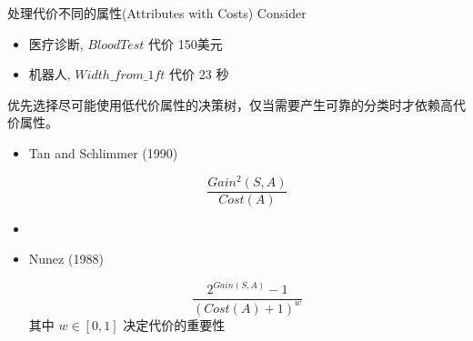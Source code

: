 \documentclass[presentation]{beamer}
\begin{document}
\begin{frame}[label={sec:org88ca31b}]{处理代价不同的属性(Attributes with Costs)}
Consider

\begin{itemize}
\item 医疗诊断,  \(BloodTest\) 代价 150美元
\item 机器人, \(Width\_from\_1ft\) 代价 23 秒
\end{itemize}

优先选择尽可能使用低代价属性的决策树，仅当需要产生可靠的分类时才依赖高代价属性。

\begin{itemize}
\item Tan and Schlimmer (1990)

\[\frac{Gain^{2}(S,A)}{Cost(A)}\]

\item \item Nunez (1988)

\[\frac{2^{Gain(S,A)} - 1}{(Cost(A) + 1)^{w}} \]
 其中 \(w \in [0,1]\) 决定代价的重要性
\end{itemize}
\end{frame}
\end{document}
